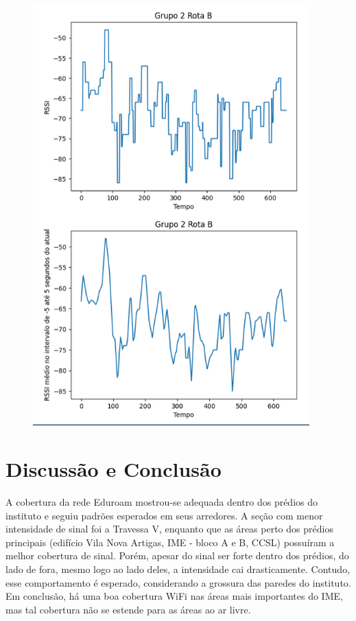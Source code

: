 \documentclass{article}
\begin{document}
\begin{figure}
  \begin{center}
    \includegraphics[width=0.95\textwidth]{figures/grupo_2-rota_b}
  \end{center}
  \caption{}\label{fig:}
\end{figure}

\section{Discussão e Conclusão}

A cobertura da rede Eduroam mostrou-se adequada dentro dos prédios do instituto e seguiu padrões esperados em seus arredores. A seção com menor intensidade de sinal foi a Travessa  V, enquanto que as áreas perto dos prédios principais (edifício Vila Nova Artigas, IME - bloco A e B, CCSL) possuíram a melhor cobertura de sinal. Porém, apesar do sinal ser forte dentro dos prédios, do lado de fora, mesmo logo ao lado deles, a intensidade cai drasticamente. Contudo, esse comportamento é esperado, considerando a grossura das paredes do instituto. Em conclusão, há uma boa cobertura WiFi nas áreas mais importantes do IME, mas tal cobertura não se estende para as áreas ao ar livre.
\end{document}
